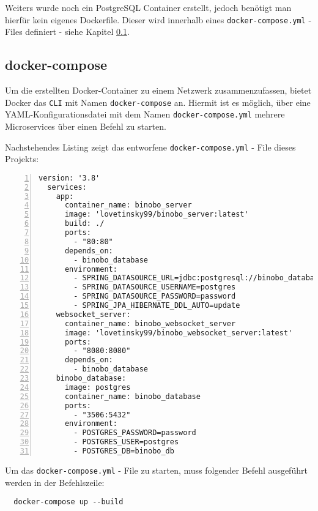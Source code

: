 \documentclass[paper=a4,12pt]{scrreprt}
\begin{document}
Weiters wurde noch ein PostgreSQL Container erstellt, jedoch benötigt man hierfür kein eigenes Dockerfile. Dieser wird innerhalb eines \texttt{docker-compose.yml} - Files definiert - siehe Kapitel \ref{ssec:docker-compose}.\newline

\subsection{docker-compose}
\label{ssec:docker-compose}

Um die erstellten Docker-Container zu einem Netzwerk zusammenzufassen, bietet Docker das \texttt{CLI} mit Namen \texttt{docker-compose}\cite{docker_compose} an. Hiermit ist es möglich, über eine YAML-Konfigurationsdatei mit dem Namen \texttt{docker-compose.yml} mehrere Microservices über einen Befehl zu starten.\newline

Nachstehendes Listing zeigt das entworfene \texttt{docker-compose.yml} - File dieses Projekts:\newline

\begin{lstlisting}[caption={docker-compose.yml}, captionpos=b, label={listing:docker_compose_file},  numbers=left, stepnumber=1]
  version: '3.8'
  services:
    app:
      container_name: binobo_server
      image: 'lovetinsky99/binobo_server:latest'
      build: ./
      ports:
        - "80:80"
      depends_on:
        - binobo_database
      environment:
        - SPRING_DATASOURCE_URL=jdbc:postgresql://binobo_database:5432/binobo_db
        - SPRING_DATASOURCE_USERNAME=postgres
        - SPRING_DATASOURCE_PASSWORD=password
        - SPRING_JPA_HIBERNATE_DDL_AUTO=update
    websocket_server:
      container_name: binobo_websocket_server
      image: 'lovetinsky99/binobo_websocket_server:latest'
      ports:
        - "8080:8080"
      depends_on:
        - binobo_database
    binobo_database:
      image: postgres
      container_name: binobo_database
      ports:
        - "3506:5432"
      environment:
        - POSTGRES_PASSWORD=password
        - POSTGRES_USER=postgres
        - POSTGRES_DB=binobo_db
\end{lstlisting}

Um das \texttt{docker-compose.yml} - File zu starten, muss folgender Befehl ausgeführt werden in der Befehlszeile:\newline

\begin{lstlisting}
  docker-compose up --build
\end{lstlisting}
\end{document}
